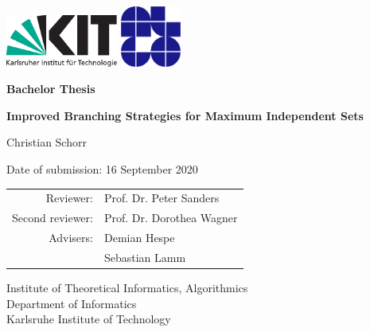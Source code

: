 \documentclass[12pt,a4paper,twoside]{scrartcl}
\numberwithin{equation}{section}
\begin{document}

\pagestyle{empty} %

\begin{titlepage}

  \begin{center}\large

    \quad\includegraphics[height=17mm]{kit_logo_de.pdf} \hfill
    \includegraphics[height=20mm]{grouplogo-algo-blue.pdf}\quad\null

    \vfill

    \textbf{Bachelor Thesis }
    \vspace*{2cm}

    \textbf{\huge{Improved Branching Strategies for Maximum Independent Sets}}

    \vfill

    Christian Schorr

    \vspace*{15mm}

    Date of submission:  16 September 2020

    \vspace*{45mm}

    \begin{tabular}{rl}
    	Reviewer: & Prof. Dr. Peter Sanders \\
    	Second reviewer: & Prof. Dr. Dorothea Wagner\\
      Advisers: & Demian Hespe \\
      & Sebastian Lamm \\
    \end{tabular}
    
    \vspace*{10mm}


     Institute of Theoretical Informatics, Algorithmics \\
     Department of Informatics \\
     Karlsruhe Institute of Technology

    \vspace*{12mm}
  \end{center}

\end{titlepage}
\end{document}
